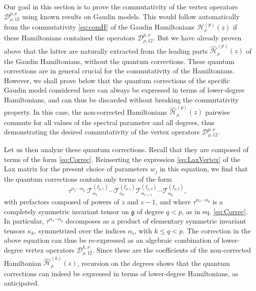 \documentclass{article}
\def\g{\mathfrak{g}}
\def\Hc{\mathcal{H}}
\begin{document}
Our goal in this section is to prove the commutativity of the vertex operators $\mathcal{D}_{\rho,12}^{p,\nu}$ 
using known results on Gaudin models. This would follow automatically from the commutativity 
\eqref{eq:comH} of the Gaudin Hamiltonians $\Hc_\rho^{(p)}(z)$ if these Hamiltonians contained the
operators $\mathcal{D}_{\rho,12}^{p,\nu}$. But we have already proven above that the latter are naturally 
extracted from the leading parts $\widehat{\Hc}^{(p)}_\rho(z)$ of the Gaudin Hamiltonians, without the 
quantum corrections. These quantum corrections are in general crucial for the commutativity of the Hamiltonians. However, we shall prove below that the quantum corrections of the specific Gaudin model considered here can always be expressed in terms of lower-degree Hamiltonians, and can thus be discarded without breaking the commutativity property. In this case, the non-corrected Hamiltonians $\widehat{\Hc}^{(p)}_\rho(z)$ pairwise commute for all values of the spectral 
parameter and all degrees, thus demonstrating the desired commutativity of the vertex operators 
$\mathcal{D}_{\rho,12}^{p,\nu}$.

Let us then analyze these quantum corrections. Recall that they are composed of terms of the form 
\eqref{eq:Correc}. Reinserting the expression \eqref{eq:LaxVertex} of the Lax matrix for the present 
choice of parameters $w_j$ in this equation, we find that the quantum corrections contain only terms 
of the form
\begin{equation}
\tau^{\alpha_1\cdots\alpha_q} \; \mathcal{T}_{\alpha_1}^{(I_{\rho,1})} \cdots 
\mathcal{T}_{\alpha_\nu}^{(I_{\rho,1})} 
\mathcal{T}_{\alpha_{\nu+1}}^{(I_{\rho,2})} \cdots \mathcal{T}_{\alpha_q}^{(I_{\rho,2})},
\end{equation}
with prefactors composed of powers of $z$ and $z-1$, and where $\tau^{\alpha_1\cdots\alpha_q}$ is a completely 
symmetric invariant tensor on $\g$ of degree $q<p$, as in eq. \eqref{eq:Correc}. In particular, 
$\tau^{\alpha_1\cdots\alpha_q}$ decomposes as a product of elementary symmetric invariant tensors $\kappa_k$,
symmetrized over the indices $\alpha_i$, with $k \leq q < p$. The correction in the above equation can thus be 
re-expressed as an algebraic combination of lower-degree vertex operators $\mathcal{D}_{\rho,12}^{k,\nu}$. Since 
these are the coefficients of the non-corrected Hamiltonian $\widehat{\Hc}^{(k)}_\rho(z)$,
recursion on the degrees shows that the quantum corrections can indeed be expressed in terms of lower-degree 
Hamiltonians, as anticipated. 
\smallskip 
\end{document}
